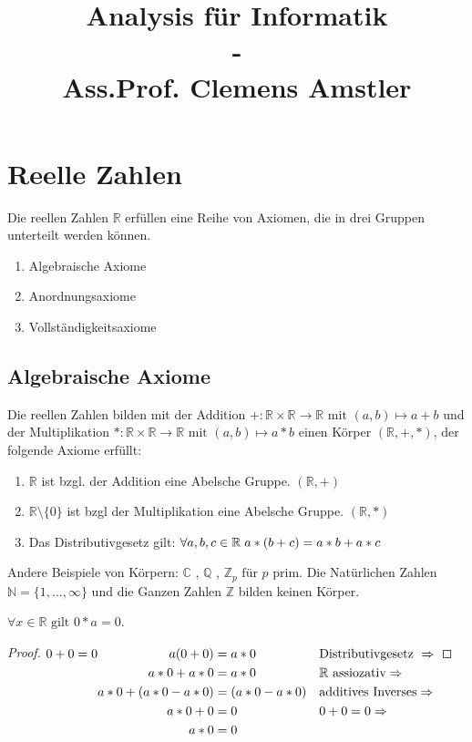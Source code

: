\documentclass[a4paper,titlepage,oneside]{article}
\title{Analysis für Informatik\small{ \\ - \\ Ass.Prof. Clemens Amstler}}
\def\C{\ensuremath{\mathbb{C}} }
\def\N{\ensuremath{\mathbb{N}} }
\def\Q{\ensuremath{\mathbb{Q}} }
\def\Z{\ensuremath{\mathbb{Z}} }
\def\R{\ensuremath{\mathbb{R}} }
\def\fa{\ensuremath{\forall}}
\def\sp{\hspace{0,1cm}}
\theoremstyle{thmstyle}
\begin{document}
\onehalfspace

\maketitle

\tableofcontents
\newpage

\section{Reelle Zahlen}
Die reellen Zahlen \R erfüllen eine Reihe von Axiomen, die in drei Gruppen unterteilt werden können.

\begin{enumerate}[label=\Roman*.]
	\item Algebraische Axiome
	\item Anordnungsaxiome
	\item Vollständigkeitsaxiome
\end{enumerate}

\subsection{Algebraische Axiome}
Die reellen Zahlen bilden mit der Addition \( + : \R \times \R \to \R \text{ mit } (a,b) \mapsto a + b\) und der Multiplikation \( * :  \R \times \R \to \R \text{ mit } (a,b) \mapsto a * b \)
einen Körper \((\R, +, * )\), der folgende Axiome erfüllt:
\begin{enumerate}[label=\arabic*)]
	\item \(\R\) ist bzgl. der Addition eine Abelsche Gruppe. \((\R,+)\)
	\item \(\R \setminus \{0\}\) ist bzgl der Multiplikation eine Abelsche Gruppe. \((\R,*)\)
	\item Das Distributivgesetz gilt: \( \fa a,b,c \in \R \sp a * (b + c) = a * b + a * c\)
\end{enumerate}
Andere Beispiele von Körpern: \C, \Q, \(\Z_p \text{ für }p\) prim.
Die Natürlichen Zahlen \(\N = \{1,\dots,\infty \} \) und die Ganzen Zahlen \Z bilden keinen Körper.

\begin{subprop}
\(\fa x \in \R \text{ gilt } 0 * a = 0\).
\begin{proof}
\begin{math}
0+0 = 0 \begin{aligned}[t] a ( 0 + 0 ) &= a * 0 					&&\text{Distributivgesetz } \Rightarrow \\
					a * 0 + a * 0 &= a * 0 				&&\text{\R assiozativ} \Rightarrow\\
					a * 0 + (a * 0 - a * 0) &= (a * 0 - a * 0) 	&& \text{additives Inverses} \Rightarrow\\
					a * 0 +  0 &= 0	 					&& 0+0 = 0 \Rightarrow\\
					a * 0 &= 0 \end{aligned}\\
\end{math}
\end{proof}
\end{subprop}
\end{document}
